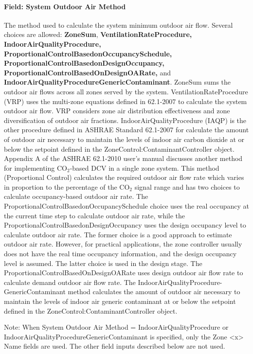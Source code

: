 \paragraph{Field: System Outdoor Air Method}\label{field-system-outdoor-air-method}

The method used to calculate the system minimum outdoor air flow. Several choices are allowed: \textbf{ZoneSum}, \textbf{VentilationRateProcedure,} \textbf{IndoorAirQualityProcedure, ProportionalControlBasedonOccupancySchedule,} \textbf{ProportionalControlBasedonDesignOccupancy,} \textbf{ProportionalControlBasedOnDesignOARate,} and \textbf{IndoorAirQualityProcedureGenericContaminant}. ZoneSum sums the outdoor air flows across all zones served by the system. VentilationRateProcedure (VRP) uses the multi-zone equations defined in 62.1-2007 to calculate the system outdoor air flow. VRP considers zone air distribution effectiveness and zone diversification of outdoor air fractions. IndoorAirQualityProcedure (IAQP) is the other procedure defined in ASHRAE Standard 62.1-2007 for calculate the amount of outdoor air necessary to maintain the levels of indoor air carbon dioxide at or below the setpoint defined in the ZoneControl:ContaminantController object. Appendix A of the ASHRAE 62.1-2010 user's manual discusses another method for implementing CO\(_{2}\)-based DCV in a single zone system. This method (Proportional Control) calculates the required outdoor air flow rate which varies in proportion to the percentage of the CO\(_{2}\) signal range and has two choices to calculate occupancy-based outdoor air rate. The ProportionalControlBasedonOccupancySchedule choice uses the real occupancy at the current time step to calculate outdoor air rate, while the ProportionalControlBasedonDesignOccupancy uses the design occupancy level to calculate outdoor air rate. The former choice is a good approach to estimate outdoor air rate. However, for practical applications, the zone controller usually does not have the real time occupancy information, and the design occupancy level is assumed. The latter choice is used in the design stage. The ProportionalControlBasedOnDesignOARate uses design outdoor air flow rate to calculate demand outdoor air flow rate. The IndoorAirQualityProcedure-GenericContaminant method calculates the amount of outdoor air necessary to maintain the levels of indoor air generic contaminant at or below the setpoint defined in the ZoneControl:ContaminantController object.

Note: When System Outdoor Air Method = IndoorAirQualityProcedure or IndoorAirQualityProcedureGenericContaminant is specified, only the Zone \textless{}x\textgreater{} Name fields are used. The other field inputs described below are not used.

